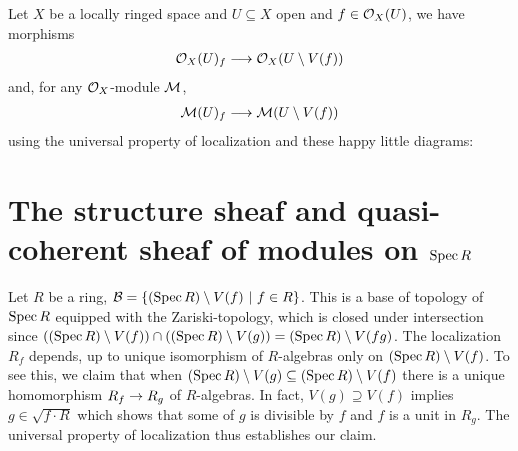 \documentclass[a4paper,parskip=half,numbers=enddot, DIV=12]{scrreprt}
\begin{document}
\begin{fact}
    Let $X$ be a locally ringed space and $U\subseteq X$ open and $f\in \mathcal{O}_X(U)$, we have morphisms 
    \begin{align*}
        \Oo_X(U)_f \morphism \Oo_X(U\setminus V(f))
    \end{align*}
    and, for any $\mathcal{O}_X$-module $\mathcal{M}$,
    \begin{align}\lbl{eq:moduleLoc}
        \Mm(U)_f \morphism \Mm(U\setminus V(f))
    \end{align}
    using the universal property of localization and these happy little diagrams:
\end{fact}


\section{The structure sheaf and quasi-coherent sheaf of modules on \texorpdfstring{$\operatorname{Spec} R$}{Spec R}}
Let $R$ be a ring, $\mathcal{B} = \left\{ (\operatorname{Spec} R)\setminus V(f)\ \middle|\  f\in R\right\}$. This is a base of topology of $\operatorname{Spec} R$ equipped with the Zariski-topology, which is closed under intersection since $((\operatorname{Spec} R)\setminus V(f))\cap ((\operatorname{Spec} R)\setminus V(g)) = (\operatorname{Spec} R)\setminus V(fg)$. The localization $R_f$ depends, up to unique isomorphism of $R$-algebras only on $(\operatorname{Spec} R)\setminus V(f)$. To see this, we claim that when $(\operatorname{Spec} R)\setminus V(g)\subseteq (\operatorname{Spec} R)\setminus V(f)$ there is a unique homomorphism $R_f\morphism R_g$ of $R$-algebras. In fact, $V(g)\supseteq V(f)$ implies $g\in \sqrt{f\cdot R}$ which shows that some of $g$ is divisible by $f$ and $f$ is a unit in $R_g$. The universal property of localization thus establishes our claim.
\end{document}
